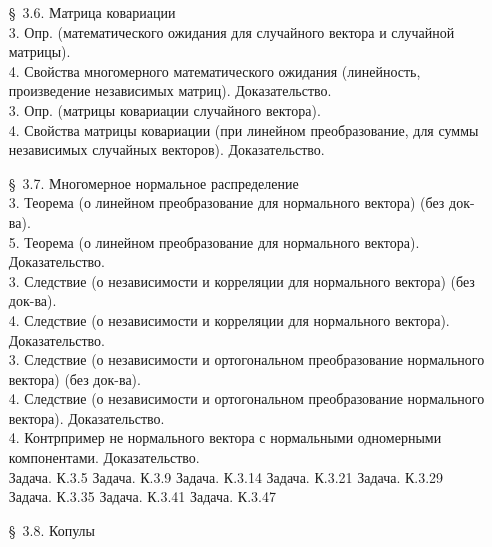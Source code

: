 \documentclass[10pt]{amsart}
\begin{document}
\begin{enumerate}
\begin{enumerate}
\item[\S\, 3.6.] Матрица ковариации \\
3. Опр. (математического ожидания для случайного вектора и случайной матрицы). \\
4. Свойства многомерного математического ожидания (линейность, произведение независимых матриц). Доказательство. \\ 
3. Опр. (матрицы ковариации случайного вектора). \\
4. Свойства матрицы ковариации (при линейном преобразование, для суммы независимых случайных векторов). Доказательство. \\


\item[\S\, 3.7.] Многомерное нормальное распределение \\

3. Теорема (о линейном преобразование для нормального вектора) (без док-ва). \\
5. Теорема (о линейном преобразование для нормального вектора). Доказательство. \\
3. Следствие (о независимости и корреляции для нормального вектора) (без док-ва). \\ 
4. Следствие (о независимости и корреляции для нормального вектора). Доказательство. \\ 
3. Следствие (о независимости и  ортогональном преобразование нормального вектора) (без док-ва). \\ 
4. Следствие (о независимости и  ортогональном преобразование нормального вектора). Доказательство. \\ 
4. Контрпример не нормального вектора с нормальными одномерными компонентами. Доказательство. \\ 
Задача. К.3.5
Задача. К.3.9
Задача. К.3.14
Задача. К.3.21
Задача. К.3.29
Задача. К.3.35
Задача. К.3.41
Задача. К.3.47

\item[\S\, 3.8.] Копулы \\
        

\end{enumerate}
\end{enumerate}
\end{document}
